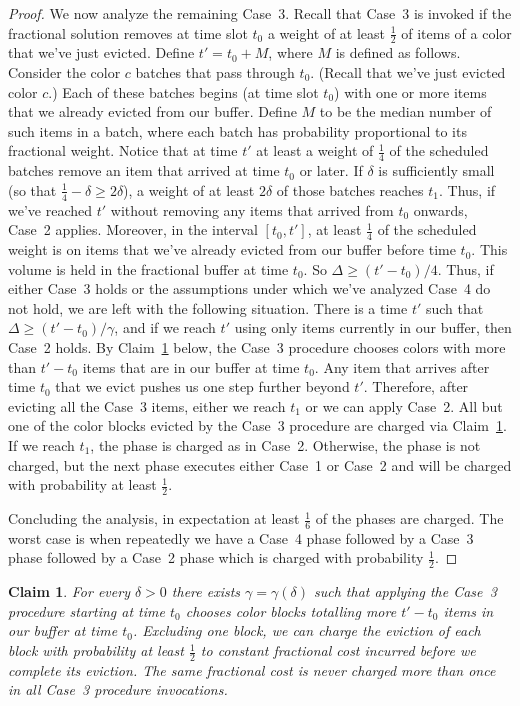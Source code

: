 \documentclass[12pt]{article}
\newtheorem{claim}[theorem]{Claim}
\begin{document}
\begin{proof}
We now analyze the remaining Case~3. Recall that Case~3 is
invoked if the fractional solution removes at time slot $t_0$
a weight of at least $\frac 1 2$ of items of a color that we've
just evicted. Define $t' = t_0 + M$, where $M$ is 
defined as follows. Consider the color $c$ batches that pass
through $t_0$. (Recall that we've just evicted color $c$.)
Each of these batches begins (at time slot $t_0$) with one
or more items that we already evicted from our buffer. Define
$M$ to be the median number of such items in a batch, where
each batch has probability proportional to its fractional weight.
Notice that at time $t'$ at least a weight of $\frac 1 4$ 
of the scheduled batches remove an item that arrived 
at time $t_0$ or later. If $\delta$
is sufficiently small (so that $\frac 1 4 - \delta\ge 2\delta$), 
a weight of at least $2\delta$ of those batches
reaches $t_1$. Thus, if we've reached $t'$ without
removing any items that arrived from $t_0$ onwards,
Case~2 applies.
Moreover, in the interval $[t_0,t']$,
at least $\frac 1 4$ of the scheduled weight is on
items that we've already evicted from our buffer
before time $t_0$. This volume is held in the fractional 
buffer at time $t_0$. So $\Delta\ge (t'-t_0)/4$.
Thus, if either Case~3 holds or the assumptions under 
which we've analyzed Case~4 do not hold, we are left 
with the following situation. There is a time $t'$ such
that $\Delta \ge (t' - t_0)/\gamma$, and if we reach
$t'$ using only items currently in our buffer, then
Case~2 holds. 
By Claim~\ref{cl: case 3 procedure} below, the Case~3 
procedure chooses colors with 
more than $t' - t_0$ items that are in our buffer at time 
$t_0$. Any item that arrives after time $t_0$ that we evict
pushes us one step further beyond $t'$. Therefore,
after evicting all the Case~3 items, either we reach $t_1$
or we can apply Case~2. All but one of the color blocks 
evicted by the Case~3 procedure are charged via 
Claim~\ref{cl: case 3 procedure}.
If we reach $t_1$, the phase is charged as in Case~2.
Otherwise, the phase is not charged, but the next phase
executes either Case~1 or Case~2 and will be charged
with probability at least $\frac 1 2$. 

Concluding the analysis, in expectation at least $\frac 1 6$ 
of the phases are charged. The worst case is when repeatedly
we have a Case~4 phase followed by a Case~3 phase followed
by a Case~2 phase which is charged with probability $\frac 1 2$. 
\end{proof}

\begin{claim}\label{cl: case 3 procedure}
For every $\delta > 0$ there exists $\gamma =\gamma(\delta)$ 
such that applying the Case~3 procedure starting at time $t_0$
chooses color blocks totalling more $t'-t_0$ items in our buffer 
at time $t_0$. Excluding one block, we can charge the eviction
of each block with probability at least $\frac 1 2$ to constant
fractional cost incurred before we complete its eviction. The
same fractional cost is never charged more than once in all
Case~3 procedure invocations.
\end{claim}
\end{document}
